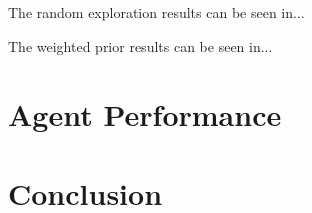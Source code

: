 \documentclass[a4paper,titlepage]{article}
\begin{document}
	The random exploration results can be seen in...
	
	
	The weighted prior results can be seen in...
	
	
	
	\section{Agent Performance}
	
	

	\section*{Conclusion}
	
	
	
	
\end{document}

